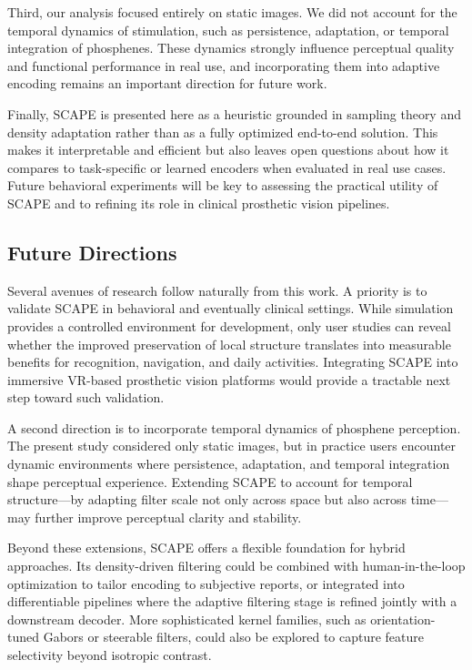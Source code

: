 Third, our analysis focused entirely on static images. We did not account for the temporal dynamics of stimulation, such as persistence, adaptation, or temporal integration of phosphenes. These dynamics strongly influence perceptual quality and functional performance in real use, and incorporating them into adaptive encoding remains an important direction for future work.

Finally, SCAPE is presented here as a heuristic grounded in sampling theory and density adaptation rather than as a fully optimized end-to-end solution. This makes it interpretable and efficient but also leaves open questions about how it compares to task-specific or learned encoders when evaluated in real use cases. Future behavioral experiments will be key to assessing the practical utility of SCAPE and to refining its role in clinical prosthetic vision pipelines.

\subsection{Future Directions}
Several avenues of research follow naturally from this work. A priority is to validate SCAPE in behavioral and eventually clinical settings. While simulation provides a controlled environment for development, only user studies can reveal whether the improved preservation of local structure translates into measurable benefits for recognition, navigation, and daily activities. Integrating SCAPE into immersive VR-based prosthetic vision platforms would provide a tractable next step toward such validation.

A second direction is to incorporate temporal dynamics of phosphene perception. The present study considered only static images, but in practice users encounter dynamic environments where persistence, adaptation, and temporal integration shape perceptual experience. Extending SCAPE to account for temporal structure—by adapting filter scale not only across space but also across time—may further improve perceptual clarity and stability.

Beyond these extensions, SCAPE offers a flexible foundation for hybrid approaches. Its density-driven filtering could be combined with human-in-the-loop optimization to tailor encoding to subjective reports, or integrated into differentiable pipelines where the adaptive filtering stage is refined jointly with a downstream decoder. More sophisticated kernel families, such as orientation-tuned Gabors or steerable filters, could also be explored to capture feature selectivity beyond isotropic contrast.

